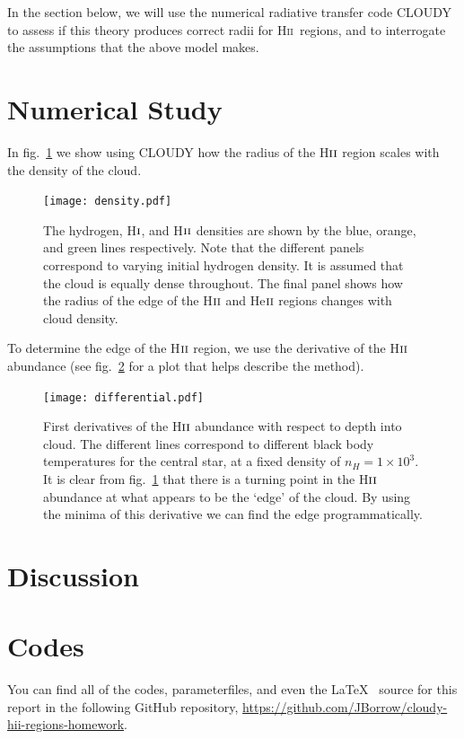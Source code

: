 \documentclass[a4paper]{article}
\newcommand{\hii}{H\textsc{ii}~}
\begin{document}
In the section below, we will use the numerical radiative transfer code
CLOUDY \citep{ferland_2017_2017} to assess if this theory produces
correct radii for \hii regions, and to interrogate the assumptions that the
above model makes.

\section{Numerical Study}

In fig.~\ref{fig:density} we show using CLOUDY how the radius of the
H$\textsc{ii}$ region scales with the density of the cloud.

\begin{figure}
\centering
\texttt{[image: density.pdf]}
\caption{The hydrogen, H$\textsc{i}$, and H$\textsc{ii}$ densities
are shown by the blue, orange, and green lines respectively. Note that
the different panels correspond to varying initial hydrogen density. It
is assumed that the cloud is equally dense throughout. The final panel
shows how the radius of the edge of the H$\textsc{ii}$ and
He$\textsc{ii}$ regions changes with cloud
density.}\label{fig:density}
\end{figure}

To determine the edge of the H$\textsc{ii}$ region, we use the
derivative of the H$\textsc{ii}$ abundance (see
fig.~\ref{fig:derivative} for a plot that helps describe the method).

\begin{figure}
\centering
\texttt{[image: differential.pdf]}
\caption{First derivatives of the H$\textsc{ii}$ abundance with
respect to depth into cloud. The different lines correspond to different
black body temperatures for the central star, at a fixed density of
$n_H = 1\times 10^3$. It is clear from fig.~\ref{fig:density} that
there is a turning point in the H$\textsc{ii}$ abundance at what
appears to be the `edge' of the cloud. By using the minima of this
derivative we can find the edge programmatically.}\label{fig:derivative}
\end{figure}

\section{Discussion}

\section{Codes}

You can find all of the codes, parameterfiles, and even the \LaTeX~ source
for this report in the following GitHub repository,
\url{https://github.com/JBorrow/cloudy-hii-regions-homework}.


\end{document}
